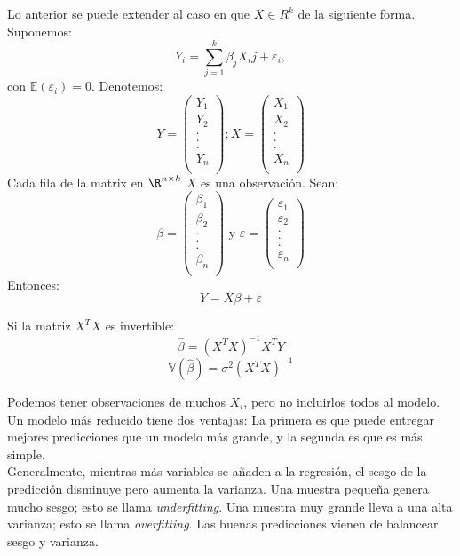 Lo anterior se puede extender al caso en que $X \in R^{k}$ de la siguiente forma. Suponemos: 
$$
Y_i= \sum_{j=1}^{k}\beta_j X_ij + \varepsilon_i,
$$
con $\mathbb{E}(\varepsilon_i)=0$. Denotemos:
$$
Y=\begin{pmatrix}
Y_1 \\
Y_2\\
.\\
.\\
.\\
Y_n\\
\end{pmatrix} ; 
X= \begin{pmatrix}
X_1 \\
X_2\\
.\\
.\\
.\\
X_n\\
\end{pmatrix}
$$
Cada fila de la matrix en $\R^{n \times k }$ $X$ es una observación. Sean:
$$
\beta= \begin{pmatrix}
\beta_1 \\
\beta_2\\
.\\
.\\
.\\
\beta_n\\
\end{pmatrix} \text{ y }
\varepsilon= \begin{pmatrix}
\varepsilon_1 \\
\varepsilon_2\\
.\\
.\\
.\\
\varepsilon_n\\
\end{pmatrix}
$$
Entonces: 
$$
Y=X\beta + \varepsilon
$$
\begin{theorem}
Si la matriz $X^{T}X$ es invertible: 
$$
\hat{\beta}= (X^{T}X)^{-1}X^{T}Y
$$
$$
\mathbb{V}(\hat{\beta})= \sigma^{2}(X^{T}X)^{-1}
$$
\end{theorem}

\begin{remark} Podemos tener observaciones de muchos $X_i$, pero no incluirlos todos al modelo. Un modelo más reducido tiene dos ventajas: La primera es que puede entregar mejores predicciones que un modelo más grande, y la segunda es que es más simple.\\  
Generalmente, mientras más variables se añaden a la regresión, el sesgo de la predicción disminuye pero aumenta la varianza. Una muestra pequeña genera mucho sesgo; esto se llama \emph{underfitting}. Una muestra muy grande lleva a una alta varianza; esto se llama \emph{overfitting}. Las buenas predicciones vienen de balancear sesgo y varianza. 
\end{remark}

